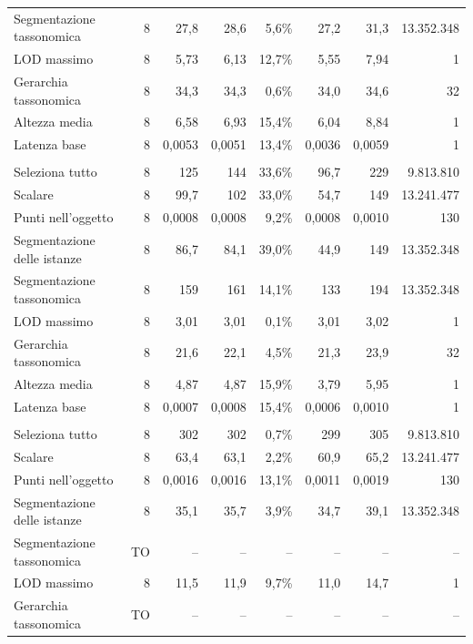 \begin{small}
\begin{longtable}{lrrrrrr r}
\quad Segmentazione tassonomica & 8 & 27,8 & 28,6 & 5,6\% & 27,2 & 31,3 & 13.352.348 \\
\quad LOD massimo & 8 & 5,73 & 6,13 & 12,7\% & 5,55 & 7,94 & 1 \\
\quad Gerarchia tassonomica & 8 & 34,3 & 34,3 & 0,6\% & 34,0 & 34,6 & 32 \\
\quad Altezza media & 8 & 6,58 & 6,93 & 15,4\% & 6,04 & 8,84 & 1 \\
\quad Latenza base & 8 & 0,0053 & 0,0051 & 13,4\% & 0,0036 & 0,0059 & 1 \\
\addlinespace
\multicolumn{8}{l}{\textbf{Owlready2}}\\
\quad Seleziona tutto & 8 & 125 & 144 & 33,6\% & 96,7 & 229 & 9.813.810 \\
\quad Scalare & 8 & 99,7 & 102 & 33,0\% & 54,7 & 149 & 13.241.477 \\
\quad Punti nell'oggetto & 8 & 0,0008 & 0,0008 & 9,2\% & 0,0008 & 0,0010 & 130 \\
\quad Segmentazione delle istanze & 8 & 86,7 & 84,1 & 39,0\% & 44,9 & 149 & 13.352.348 \\
\quad Segmentazione tassonomica & 8 & 159 & 161 & 14,1\% & 133 & 194 & 13.352.348 \\
\quad LOD massimo & 8 & 3,01 & 3,01 & 0,1\% & 3,01 & 3,02 & 1 \\
\quad Gerarchia tassonomica & 8 & 21,6 & 22,1 & 4,5\% & 21,3 & 23,9 & 32 \\
\quad Altezza media & 8 & 4,87 & 4,87 & 15,9\% & 3,79 & 5,95 & 1 \\
\quad Latenza base & 8 & 0,0007 & 0,0008 & 15,4\% & 0,0006 & 0,0010 & 1 \\
\addlinespace
\multicolumn{8}{l}{\textbf{Oxigraph}}\\
\quad Seleziona tutto & 8 & 302 & 302 & 0,7\% & 299 & 305 & 9.813.810 \\
\quad Scalare & 8 & 63,4 & 63,1 & 2,2\% & 60,9 & 65,2 & 13.241.477 \\
\quad Punti nell'oggetto & 8 & 0,0016 & 0,0016 & 13,1\% & 0,0011 & 0,0019 & 130 \\
\quad Segmentazione delle istanze & 8 & 35,1 & 35,7 & 3,9\% & 34,7 & 39,1 & 13.352.348 \\
\quad Segmentazione tassonomica & \textsf{TO} & -- & -- & -- & -- & -- & -- \\
\quad LOD massimo & 8 & 11,5 & 11,9 & 9,7\% & 11,0 & 14,7 & 1 \\
\quad Gerarchia tassonomica & \textsf{TO} & -- & -- & -- & -- & -- & -- \\

\end{longtable}
\end{small}
